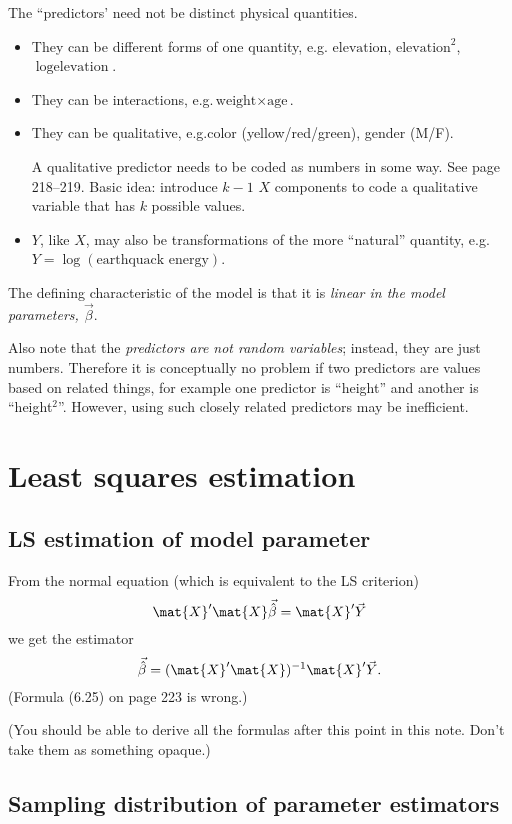 \documentclass[12pt]{article}
\begin{document}
The ``predictors' need not be distinct physical quantities.
\begin{itemize}
\item
They can be different forms of one quantity, e.g.\@
$\text{elevation}$,
$\text{elevation}^2$,
$\log\text{elevation}$.
\item
They can be interactions,
e.g.\@ $\text{weight} \times \text{age}$.
\item
They can be qualitative,
e.g.\@ color (yellow/red/green), gender (M/F).

A qualitative predictor needs to be coded as numbers in some way.
See page 218--219.
Basic idea:
introduce $k-1$ $X$ components to code a qualitative variable
that has $k$ possible values.

\item
$Y$, like $X$,
may also be transformations of the more ``natural''
quantity,
e.g.\@ $Y = \log(\text{earthquack energy})$.
\end{itemize}

The defining characteristic of the model is that
it is \emph{linear in the model
parameters, $\vec{\beta}$}.

Also note that the \emph{predictors are not random variables};
instead, they are just numbers.
Therefore it is conceptually no problem if two predictors
are values based on related things,
for example one predictor is ``height'' and another is ``height$^2$''.
However, using such closely related predictors may be inefficient.

\section{Least squares estimation}

\subsection{LS estimation of model parameter}

From the normal equation
(which is equivalent to the LS criterion)
\[
\mat{X}'\mat{X}\vec{\hat\beta} = \mat{X}'\vec{Y}
\]
we get the estimator
\[
\vec{\hat\beta} = (\mat{X}'\mat{X})^{-1}\mat{X}'\vec{Y}
.
\]
(Formula (6.25) on page 223 is wrong.)

(You should be able to derive all the formulas after this point in this
note. Don't take them as something opaque.)

\subsection{Sampling distribution of parameter estimators}
\end{document}
